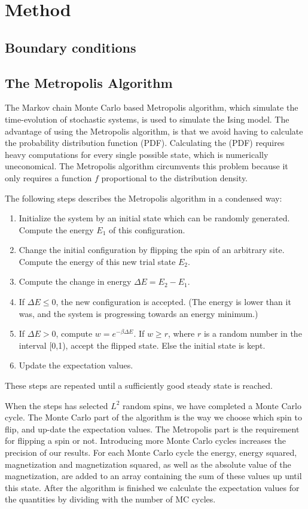 \documentclass[../main.tex]{subfiles}
\begin{document}
\section{Method}\label{sec:method}

\subsection{Boundary conditions}

\subsection{The Metropolis Algorithm}
The Markov chain Monte Carlo based Metropolis algorithm, which simulate the time-evolution of stochastic systems, is used to simulate the Ising model. The advantage of using the Metropolis algorithm, is that we avoid having to calculate the probability distribution function (PDF). Calculating the (PDF) requires heavy computations for every single possible state, which is numerically uneconomical. The Metropolis algorithm circumvents this problem because it only requires a function $f$ proportional to the distribution density.

The following steps describes the Metropolis algorithm in a condensed way:

\begin{enumerate}
    \item Initialize the system by an initial state which can be randomly generated. Compute the energy $E_1$ of this configuration. 
    \item Change the initial configuration by flipping the spin of an arbitrary site. Compute the energy of this new trial state $E_2$. 
    \item Compute the change in energy \ensuremath{\Delta E= E_2-E_1}.
    \item If \ensuremath{\Delta E\leq0}, the new configuration is accepted. (The energy is lower than it was, and the system is progressing towards an energy minimum.)
    \item If \ensuremath{\Delta E>0}, compute \ensuremath{w=e^{-\beta\Delta E}}. If \ensuremath{w\geq r}, where $r$ is a random number in the interval [0,1), accept the flipped state. Else the initial state is kept.
    \item Update the expectation values. 
\end{enumerate} These steps are repeated until a sufficiently good steady state is reached. 

When the steps has selected $L^2$ random spins, we have completed a Monte Carlo cycle. The Monte Carlo part of the algorithm is the way we choose which spin to flip,  and up-date the expectation values. The Metropolis part is the requirement for flipping a spin or not. Introducing more Monte Carlo cycles increases the precision of our results. For each Monte Carlo cycle the energy, energy squared, magnetization and magnetization squared, as well as the absolute value of the magnetization, are added to an array containing the sum of these values up until this state. After the algorithm is finished we calculate the expectation values for the quantities by dividing with the number of MC cycles.
\end{document}
